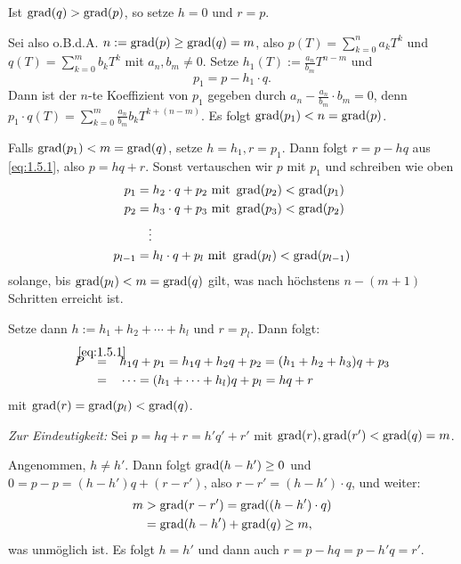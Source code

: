 \begin{beweis}
	Ist $\operatorname{grad}(q) > \operatorname{grad}(p)$, so setze $h=0$ und $r=p$.
	
	Sei also o.B.d.A. $n := \operatorname{grad}(p) \geq \operatorname{grad}(q) = m$, also $p(T) = \sum_{k=0}^{n} a_kT^{k}$ und $q(T) = \sum_{k=0}^{m} b_kT^{k}$ mit $a_n,b_m \neq 0$. Setze $h_1(T) := \frac{a_n}{b_m} T^{n-m}$ und
	\begin{equation}
		p_1 = p-h_1 \cdot q. \label{eq:1.5.1}
	\end{equation}
	Dann ist der $n$-te Koeffizient von $p_1$ gegeben durch $a_n - \frac{a_n}{b_m} \cdot b_m = 0$, denn $p_1 \cdot q(T) = \sum_{k=0}^{m} \frac{a_n}{b_m} b_k T^{k+(n-m)}$.
	Es folgt $\operatorname{grad}(p_1) < n = \operatorname{grad}(p)$.
	
	Falls $\operatorname{grad}(p_1) < m = \operatorname{grad}(q)$, setze $h = h_1, r= p_1$.
	Dann folgt $r = p-hq$ aus \eqref{eq:1.5.1}, also $p = hq+r$.
	Sonst vertauschen wir $p$ mit $p_1$ und schreiben wie oben
	\begin{align*}
		p_1 &= h_2 \cdot q + p_2 \text{ mit } \operatorname{grad}(p_2) < \operatorname{grad}(p_1) \\
		p_2 &= h_3 \cdot q + p_3 \text{ mit } \operatorname{grad}(p_3) < \operatorname{grad}(p_2) \\
		&\quad \vdots \\
		p_{l-1} &= h_l \cdot q + p_l \text{ mit } \operatorname{grad}(p_l) < \operatorname{grad}(p_{l-1})
	\end{align*}
	solange, bis $\operatorname{grad}(p_l) < m = \operatorname{grad}(q)$ gilt, was nach höchstens $n-(m+1)$ Schritten erreicht ist.
	
	Setze dann $h := h_1 + h_2 + \cdots + h_l$ und $r = p_l$.
	Dann folgt:
	\begin{align*}
		P &\stack{\eqref{eq:1.5.1}}{=} h_1 q + p_1 = h_1 q + h_2 q + p_2 =  (h_1+h_2+h_3)q + p_3 \\
		&\stack{}{=} \dots = (h_1 + \dots + h_l)q + p_l = hq + r
	\end{align*}
	mit $\operatorname{grad}(r) = \operatorname{grad}(p_l) < \operatorname{grad}(q)$.
	
	\textit{Zur Eindeutigkeit:} Sei $p = hq + r = h'q'+r'$ mit $\operatorname{grad}(r), \operatorname{grad}(r') < \operatorname{grad}(q) = m$.
	
	Angenommen, $h \neq h'$.
	Dann folgt $\operatorname{grad}(h-h') \geq 0$ und $0 = p-p = (h-h')q + (r-r')$, also $r-r' = (h-h') \cdot q$, und weiter:
	\begin{align*}
		m &> \operatorname{grad}(r-r') = \operatorname{grad}((h-h')\cdot q) \\
		&= \operatorname{grad}(h-h') + \operatorname{grad}(q) \geq m,
	\end{align*}
	was unmöglich ist.
	Es folgt $h = h'$ und dann auch $r = p-hq = p-h'q = r'$. 
\end{beweis}

